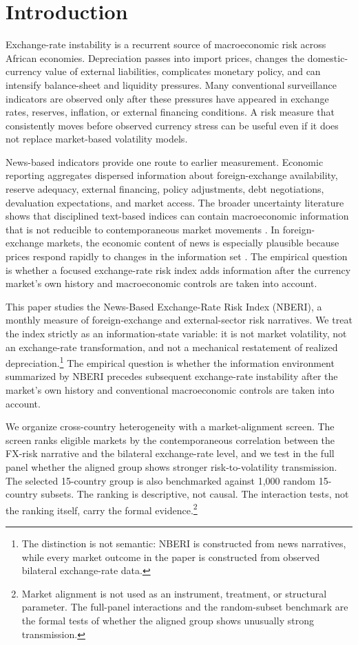 \documentclass[11pt]{article}
\begin{document}
\section{Introduction}\label{introduction}

Exchange-rate instability is a recurrent source of macroeconomic
risk across African economies. Depreciation passes into import prices,
changes the domestic-currency value of external liabilities, complicates
monetary policy, and can intensify balance-sheet and liquidity
pressures. Many conventional surveillance indicators are observed
only after these pressures have appeared in exchange rates, reserves,
inflation, or external financing conditions. A risk measure that
consistently moves before observed currency stress can be
useful even if it does not replace market-based volatility models.

News-based indicators provide one route to earlier measurement. Economic
reporting aggregates dispersed information about foreign-exchange
availability, reserve adequacy, external financing, policy adjustments,
debt negotiations, devaluation expectations, and market access. The
broader uncertainty literature shows that disciplined text-based indices
can contain macroeconomic information that is not reducible to
contemporaneous market movements \citep{baker2016,caldara2022}. In foreign-exchange markets, the economic content
of news is especially plausible because prices respond rapidly to
changes in the information set \citep{andersen2003}. The empirical
question is whether a focused exchange-rate risk index adds information
after the currency market's own history and
macroeconomic controls are taken into account.

This paper studies the News-Based Exchange-Rate Risk Index (NBERI), a
monthly measure of foreign-exchange and external-sector risk narratives.
We treat the index strictly as an information-state variable: it is
not market volatility, not an exchange-rate transformation, and not a
mechanical restatement of realized depreciation.\footnote{The distinction is not semantic: NBERI is constructed from news narratives, while every market outcome in the paper is constructed from observed bilateral exchange-rate data.} The empirical question
is whether the information environment summarized by NBERI precedes
subsequent exchange-rate instability after the market's
own history and conventional macroeconomic controls are taken into
account.

We organize cross-country heterogeneity with a market-alignment screen.
The screen ranks eligible markets by the contemporaneous correlation
between the FX-risk narrative and the bilateral exchange-rate level, and
we test in the full panel whether the aligned group shows stronger
risk-to-volatility transmission. The selected 15-country group is also
benchmarked against 1,000 random 15-country subsets. The ranking is
descriptive, not causal. The interaction tests, not the ranking itself,
carry the formal evidence.\footnote{Market alignment is not used as an instrument, treatment, or structural parameter. The full-panel interactions and the random-subset benchmark are the formal tests of whether the aligned group shows unusually strong transmission.}
\end{document}
